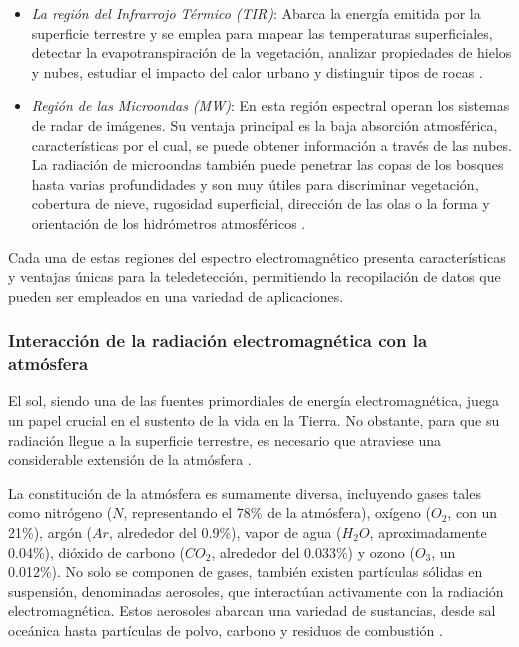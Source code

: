 \begin{itemize}
    \item \textit{La región del Infrarrojo Térmico (TIR)}: Abarca la energía emitida por la superficie terrestre y se emplea para mapear las temperaturas superficiales, detectar la evapotranspiración de la vegetación, analizar propiedades de hielos y nubes, estudiar el impacto del calor urbano y distinguir tipos de rocas \cite{canada2007fundamentals,emery2017introduction}.

    \item \textit{Región de las Microondas (MW)}: En esta región espectral operan los sistemas de radar de imágenes. Su ventaja principal es la baja absorción atmosférica, características por el cual, se puede obtener información a través de las nubes. La radiación de microondas también puede penetrar las copas de los bosques hasta varias profundidades y son muy útiles para discriminar vegetación, cobertura de nieve, rugosidad superficial, dirección de las olas o la forma y orientación de los hidrómetros atmosféricos \cite{emery2017introduction}.

\end{itemize}

Cada una de estas regiones del espectro electromagnético presenta características y ventajas únicas para la teledetección, permitiendo la recopilación de datos que pueden ser empleados en una variedad de aplicaciones.

\subsubsection{Interacción de la radiación electromagnética con la atmósfera}

El sol, siendo una de las fuentes primordiales de energía electromagnética, juega un papel crucial en el sustento de la vida en la Tierra. No obstante, para que su radiación llegue a la superficie terrestre, es necesario que atraviese una considerable extensión de la atmósfera \cite{tempfli2009principles}.

La constitución de la atmósfera es sumamente diversa, incluyendo gases tales como nitrógeno ($N$, representando el 78\% de la atmósfera), oxígeno ($O_{2}$, con un 21\%), argón ($Ar$, alrededor del 0.9\%), vapor de agua ($H_{2}O$, aproximadamente 0.04\%), dióxido de carbono ($CO_{2}$, alrededor del 0.033\%) y ozono ($O_{3}$, un 0.012\%). No solo se componen de gases, también existen partículas sólidas en suspensión, denominadas aerosoles, que interactúan activamente con la radiación electromagnética. Estos aerosoles abarcan una variedad de sustancias, desde sal oceánica hasta partículas de polvo, carbono y residuos de combustión \cite{chuvieco2016fundamentals}.

